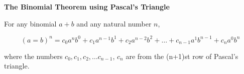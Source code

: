 {\bf The Binomial Theorem using Pascal's Triangle}
\vskip 6pt

For any binomial $a+b$ and any natural number $n$,

$${(a=b)}^n=c_0a^nb^0+c_1a^{n-1}b^1+c_2a^{n-2}b^2+\ldots +c_{n-1}a^1b^{n-1}+c_na^0b^n$$

where the numbers $c_0,c_1,c_2,\ldots c_{n-1}$, $c_n$ are from  the (n+1)st row of Pascal's triangle.

\vfill\eject
